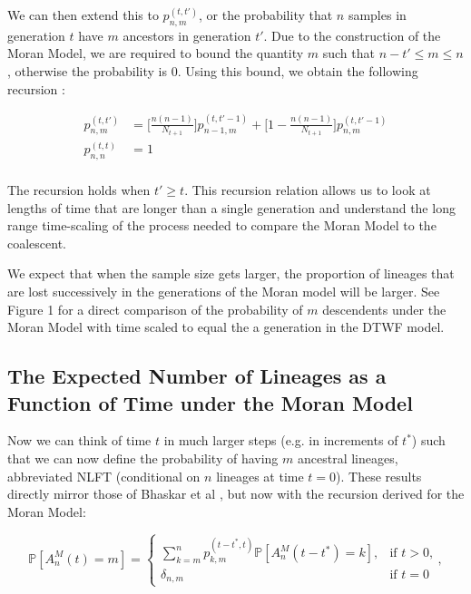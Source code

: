 \documentclass[11pt, twocolumn]{article}
\begin{document}
We can then extend this to $p^{(t, t')}_{n,m}$, or the probability that $n$ samples in generation $t$ have $m$  ancestors in generation $t'$. Due to the construction of the Moran Model, we are required to bound the quantity $m$ such that $n - t' \leq m \leq n$, otherwise the probability is $0$. Using this bound, we obtain the following recursion :

\begin{equation}
\begin{aligned}
	p^{(t, t')}_{n,m} &= \Bigg[\frac{n(n-1)}{N_{t+1}}\Bigg] p^{(t, t'-1)}_{n-1, m} + \Bigg[1 - \frac{n(n-1)}{N_{t+1}}\Bigg] p^{(t, t'-1)}_{n,m}\\
	p^{(t, t)}_{n,n} &= 1\\
\end{aligned}
\end{equation}

The recursion holds when $t' \geq t$. This recursion relation allows us to look at lengths of time that are longer than a single generation and understand the long range time-scaling of the process needed to compare the Moran Model to the coalescent.  

We expect that when the sample size gets larger, the proportion of lineages that are lost successively in the generations of the Moran model will be larger. See Figure 1 for a direct comparison of the probability of $m$ descendents under the Moran Model with time scaled to equal the a generation in the DTWF model. 

\subsection{The Expected Number of Lineages as a Function of Time under the Moran Model}

Now we can think of time $t$ in much larger steps (e.g. in increments of $t^*$) such that we can now define the probability of having $m$ ancestral lineages, abbreviated NLFT (conditional on $n$ lineages at time $t = 0$). These results directly mirror those of Bhaskar et al \citet{Bhaskar2014}, but now with the recursion derived for the Moran Model:

\begin{strip}
\begin{equation}
 \mathbb{P}[A^M_n(t) = m] =
 \begin{cases} 
	 \sum^n_{k=m}  p^{(t-t^*, t)}_{k,m} \mathbb{P}[A^M_n (t-t^*) = k],  &\text{if $t > 0$,}
 	 \\
	 \delta_{n,m} &\text{if $t = 0$}
 \end{cases},
\end{equation}
\end{strip}
\end{document}
